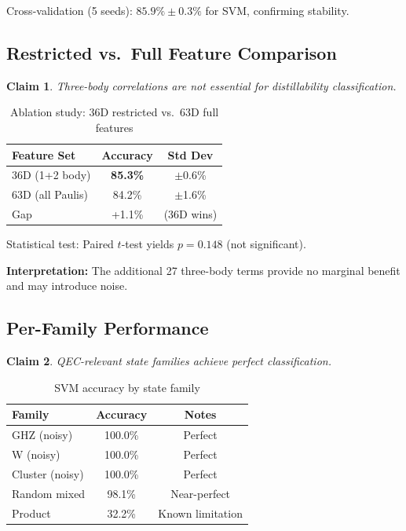 \documentclass[11pt,a4paper]{article}
\newtheorem{claim}{Claim}
\begin{document}
Cross-validation (5 seeds): $85.9\% \pm 0.3\%$ for SVM, confirming stability.

\subsection{Restricted vs.\ Full Feature Comparison}

\begin{claim}
Three-body correlations are not essential for distillability classification.
\end{claim}

\begin{table}[h]
\centering
\caption{Ablation study: 36D restricted vs.\ 63D full features}
\begin{tabular}{lcc}
\toprule
\textbf{Feature Set} & \textbf{Accuracy} & \textbf{Std Dev} \\
\midrule
36D (1+2 body) & \textbf{85.3\%} & $\pm$0.6\% \\
63D (all Paulis) & 84.2\% & $\pm$1.6\% \\
\midrule
Gap & +1.1\% & (36D wins) \\
\bottomrule
\end{tabular}
\end{table}

Statistical test: Paired $t$-test yields $p = 0.148$ (not significant).

\textbf{Interpretation:} The additional 27 three-body terms provide no marginal benefit and may introduce noise.

\subsection{Per-Family Performance}

\begin{claim}
QEC-relevant state families achieve perfect classification.
\end{claim}

\begin{table}[h]
\centering
\caption{SVM accuracy by state family}
\begin{tabular}{lcc}
\toprule
\textbf{Family} & \textbf{Accuracy} & \textbf{Notes} \\
\midrule
GHZ (noisy) & 100.0\% & Perfect \\
W (noisy) & 100.0\% & Perfect \\
Cluster (noisy) & 100.0\% & Perfect \\
Random mixed & 98.1\% & Near-perfect \\
Product & 32.2\% & Known limitation \\
\bottomrule
\end{tabular}
\end{table}
\end{document}
